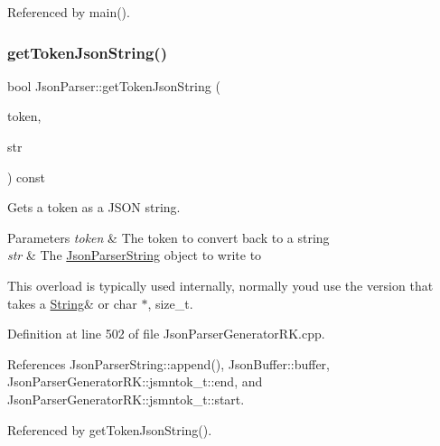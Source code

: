 Referenced by main().

\mbox{\label{class_json_parser_a4c6d9fc64d49d057dd2b7b3ea63a7d8c}} 
\subsubsection{\texorpdfstring{get\+Token\+Json\+String()}{getTokenJsonString()}\hspace{0.1cm}{\footnotesize\ttfamily [3/3]}}
{\footnotesize\ttfamily bool Json\+Parser\+::get\+Token\+Json\+String (\begin{DoxyParamCaption}\item[{const \hyperlink{struct_json_parser_generator_r_k_1_1jsmntok__t}{Json\+Parser\+Generator\+R\+K\+::jsmntok\+\_\+t} $\ast$}]{token,  }\item[{\hyperlink{class_json_parser_string}{Json\+Parser\+String} \&}]{str }\end{DoxyParamCaption}) const}



Gets a token as a J\+S\+ON string. 


\begin{DoxyParams}{Parameters}
{\em token} & The token to convert back to a string\\
\hline
{\em str} & The \hyperlink{class_json_parser_string}{Json\+Parser\+String} object to write to\\
\hline
\end{DoxyParams}
This overload is typically used internally, normally you\textquotesingle{}d use the version that takes a \hyperlink{class_string}{String}\& or char $\ast$, size\+\_\+t. 

Definition at line 502 of file Json\+Parser\+Generator\+R\+K.\+cpp.



References Json\+Parser\+String\+::append(), Json\+Buffer\+::buffer, Json\+Parser\+Generator\+R\+K\+::jsmntok\+\_\+t\+::end, and Json\+Parser\+Generator\+R\+K\+::jsmntok\+\_\+t\+::start.



Referenced by get\+Token\+Json\+String().

\mbox{\label{class_json_parser_a1cdeae1e2cf1b45cde47ca8a8f9a84c9}} 
